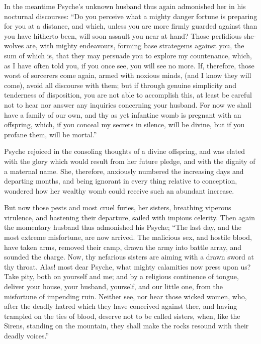 \documentclass{article}
\begin{document}
In the meantime Psyche's unknown husband thus again admonished her in his
nocturnal discourses: ``Do you perceive what a mighty danger fortune is
preparing for you at a distance, and which, unless you are more firmly guarded
against than you have hitherto been, will soon assault you near at hand? Those
perfidious she-wolves are, with mighty endeavours, forming base strategems
against you, the sum of which is, that they may persuade you to explore my
countenance, which, as I have often told you, if you once see, you will see no
more. If, therefore, those worst of sorcerers come again, armed with noxious
minds, (and I know they will come), avoid all discourse with them; but if
through genuine simplicity and tenderness of disposition, you are not able to
accomplish this, at least be careful not to hear nor answer any inquiries
concerning your husband. For now we shall have a family of our own, and thy as
yet infantine womb is pregnant with an offspring, which, if you conceal my
secrets in silence, will be divine, but if you profane them, will be mortal.''

Psyche rejoiced in the consoling thoughts of a divine offspring, and was elated
with the glory which would result from her future pledge, and with the dignity
of a maternal name. She, therefore, anxiously numbered the increasing days and
departing months, and being ignorant in every thing relative to conception,
wondered how her wealthy womb could receive such an abundant increase.

But now those pests and most cruel furies, her sisters, breathing viperous
virulence, and hastening their departure, sailed with impious celerity. Then
again the momentary husband thus admonished his Psyche; ``The last day, and the
most extreme misfortune, are now arrived. The malicious sex, and hostile blood,
have taken arms, removed their camp, drawn the army into battle array, and
sounded the charge. Now, thy nefarious sisters are aiming with a drawn sword at
thy throat. Alas! most dear Psyche, what mighty calamities now press upon us?
Take pity, both on yourself and me; and by a religious continence of tongue,
deliver your house, your husband, yourself, and our little one, from the
misfortune of impending ruin. Neither see, nor hear those wicked women, who,
after the deadly hatred which they have conceived against thee, and having
trampled on the ties of blood, deserve not to be called sisters, when, like the
Sirens, standing on the mountain, they shall make the rocks resound with their
deadly voices.''
\end{document}

